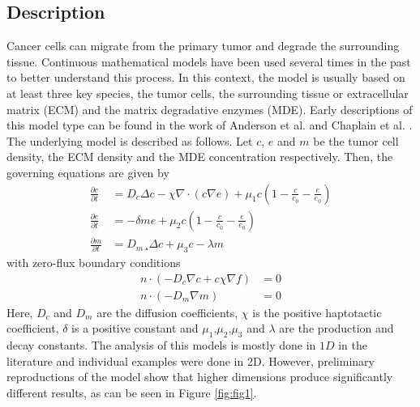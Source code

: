 \documentclass[12pt]{article}
\begin{document}
\subsection*{Description}
Cancer cells can migrate from the primary tumor and degrade the surrounding tissue. Continuous mathematical models have been used several times in the past to better understand this process. In this context, the model is usually based on at least three key species, the tumor cells, the surrounding tissue or extracellular matrix (ECM) and the matrix degradative enzymes (MDE). Early descriptions of this model type can be found in the work of Anderson et al. \cite{anderson_continuous_1998,anderson_mathematical_2000} and Chaplain et al. \cite{anderson_continuous_1998,chaplain_mathematical_2006,chaplain_mathematical_2006-1,franssen_mathematical_2019}. The underlying model is described as follows. Let $c$, $e$ and $m$ be the tumor cell density, the ECM density and the MDE concentration respectively. Then, the governing equations are given by
\begin{align}
	\frac{\partial c}{\partial t} &= D_c \Delta c - \chi \nabla \cdot (c\nabla e) + \mu_1 c\left(1-\frac{c}{c_0}-\frac{e}{e_0}\right)\\
	\frac{\partial e}{\partial t} &= -\delta m e  + \mu_2 c\left(1-\frac{c}{c_0}-\frac{e}{e_0}\right)\\
	\frac{\partial m}{\partial t} &= D_m¸ \Delta c + \mu_3 c - \lambda m
\end{align}
with zero-flux boundary conditions 
\begin{align}
	n\cdot (-D_c \nabla c + c \chi\nabla f) &= 0 \\
	n \cdot (-D_m\nabla m ) &= 0
\end{align}
\newpage
{}
\noindent Here, $D_c$ and $D_m$ are the diffusion coefficients, $\chi$ is the positive haptotactic coefficient, $\delta$ is a positive constant and $\mu_1$,$\mu_2$,$\mu_3$ and $\lambda$ are the production and decay constants. \newline 
The analysis of this models is mostly done in $1D$ in the literature and individual examples were done in 2D. However, preliminary reproductions of the model show that higher dimensions produce significantly different results, as can be seen in Figure \ref{fig:fig1}.
\end{document}
